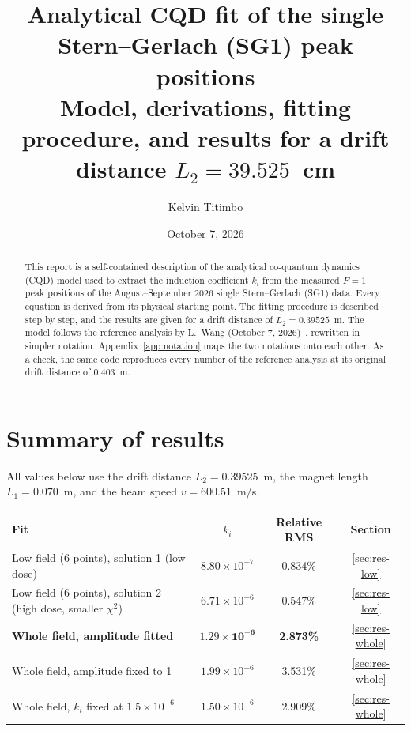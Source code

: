 \documentclass[11pt,a4paper]{article}
\title{Analytical CQD fit of the single Stern--Gerlach (SG1) peak positions\\[4pt]
\large Model, derivations, fitting procedure, and results for a drift distance $L_2 = 39.525$~cm}
\author{Kelvin Titimbo}
\date{October 7, 2026}
\begin{document}
\maketitle

\begin{abstract}
\noindent This report is a self-contained description of the analytical co-quantum dynamics (CQD) model used to extract the induction coefficient $k_i$ from the measured $F=1$ peak positions of the August--September 2026 single Stern--Gerlach (SG1) data. Every equation is derived from its physical starting point. The fitting procedure is described step by step, and the results are given for a drift distance of $L_2 = 0.39525$~m. The model follows the reference analysis by L.~Wang (October 7, 2026)~\cite{wang2026}, rewritten in simpler notation. Appendix~\ref{app:notation} maps the two notations onto each other. As a check, the same code reproduces every number of the reference analysis at its original drift distance of $0.403$~m.
\end{abstract}

\tableofcontents

\section{Summary of results}

All values below use the drift distance $L_2 = 0.39525$~m, the magnet length $L_1 = 0.070$~m, and the beam speed $v = 600.51$~m/s.

\begin{center}
\small\begin{tabular}{lccc}
\toprule
Fit & $k_i$ & Relative RMS & Section \\
\midrule
Low field (6 points), solution 1 (low dose)   & $8.80\times10^{-7}$  & 0.834\% & \ref{sec:res-low}\\
Low field (6 points), solution 2 (high dose, smaller $\chi^2$) & $6.71\times10^{-6}$  & 0.547\% & \ref{sec:res-low}\\
\textbf{Whole field, amplitude fitted}         & $\mathbf{1.29\times10^{-6}}$ & \textbf{2.873\%} & \ref{sec:res-whole}\\
Whole field, amplitude fixed to 1              & $1.99\times10^{-6}$  & 3.531\% & \ref{sec:res-whole}\\
Whole field, $k_i$ fixed at $1.5\times10^{-6}$ & $1.50\times10^{-6}$  & 2.909\% & \ref{sec:res-whole}\\
\bottomrule
\end{tabular}
\end{center}
\end{document}
